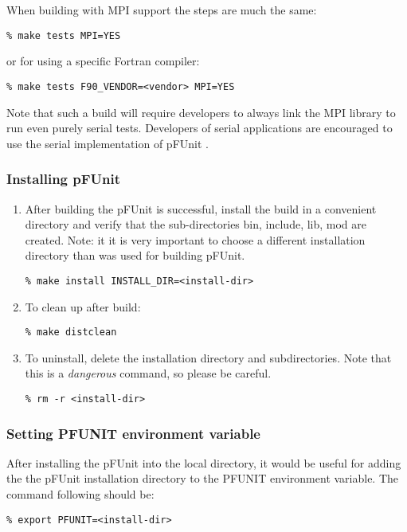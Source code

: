 \documentclass[10pt]{article}
\newcommand{\pfunit}{{\sc pFUnit }}
\begin{document}
When building with MPI support the steps are much the same:	
\begin{verbatim}
% make tests MPI=YES
\end{verbatim}
or for using a specific Fortran compiler:
\begin{verbatim}
% make tests F90_VENDOR=<vendor> MPI=YES
\end{verbatim}
Note that such a build will require developers to always link the MPI
library to run even purely serial tests.  Developers of serial
applications are encouraged to use the serial implementation of
\pfunit.

\subsubsection{Installing \pfunit}
\begin{enumerate}
\item After building the \pfunit is successful, install the build in a
  convenient directory and verify that the sub-directories bin,
  include, lib, mod are created.  Note: it it is very important to
  choose a different installation directory than was used for building pFUnit.
\begin{verbatim}
% make install INSTALL_DIR=<install-dir>
\end{verbatim}

\item To clean up after build:
\begin{verbatim}
% make distclean
\end{verbatim}

\item To uninstall, delete the installation directory and
  subdirectories.  Note that this is a \emph{dangerous} command, so
  please be careful.
\begin{verbatim}
% rm -r <install-dir>
\end{verbatim}
\end{enumerate}

\subsubsection{Setting PFUNIT environment variable}
After installing the \pfunit into the local directory, it would be
useful for adding the the \pfunit installation directory to the PFUNIT
environment variable.  The command following should be:
\begin{verbatim}
% export PFUNIT=<install-dir>
\end{verbatim}
\end{document}
